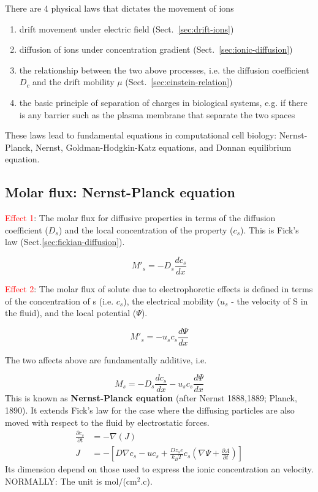 There are 4 physical laws that dictates the movement of ions
\begin{enumerate}
\item drift movement under electric field (Sect.~\ref{sec:drift-ions})
\item diffusion of ions under concentration
gradient (Sect.~\ref{sec:ionic-diffusion})
\item the relationship between the two above processes, i.e. the
  diffusion coefficient $D_c$ and the drift mobility $\mu$
  (Sect.~\ref{sec:einstein-relation})
\item the basic principle of separation of charges in biological systems, e.g.
if there is any barrier such as the plasma membrane that separate the two spaces
\end{enumerate}
These laws lead to fundamental equations in computational cell
biology: Nernst-Planck, Nernst, Goldman-Hodgkin-Katz equations, and
Donnan equilibrium equation.

\subsection{Molar flux: Nernst-Planck equation}
\label{sec:flux-molar-flux}
\label{sec:Nernst-Planck-equation}

\textcolor{red}{Effect 1}: The molar flux for diffusive properties in terms of
the diffusion coefficient ($D_s$) and the local concentration of the property
($c_s$). This is Fick's law (Sect.\ref{sec:fickian-diffusion}).

\begin{equation}
M'_s = -D_s \frac{dc_s}{dx}
\end{equation}

\textcolor{red}{Effect 2}: The molar flux of solute due to electrophoretic
effects is defined in terms of the concentration of s (i.e. $c_s$), the
electrical mobility ($u_s$ - the velocity of S in the fluid), and the local
potential ($\Psi$).

\begin{equation}
M'_s = - u_s c_s \frac{d\Psi}{dx} 
\end{equation}


The two affects above are fundamentally additive, i.e.

\begin{equation}
M_s = -D_s \frac{dc_s}{dx} - u_s c_s \frac{d\Psi}{dx}
\end{equation}
This is known as {\bf Nernst-Planck equation} (after Nernst 1888,1889; Planck,
1890). It extends Fick's law for the case where the diffusing particles are also
moved with respect to the fluid by electrostatic forces.
\begin{equation}
\begin{split} 
\frac{\partial c_s}{\partial t} &= -\nabla(J) \\
J &= - \left[ D \nabla c_s - u c_s + \frac{Dz_s e}{k_BT} c_s (\nabla \Psi +
\frac{\partial A}{\partial t}) \right] 
\end{split}
\end{equation}
Its dimension depend on those used to express the ionic concentration an
velocity. NORMALLY: The unit is mol/(cm$^2$.c).

